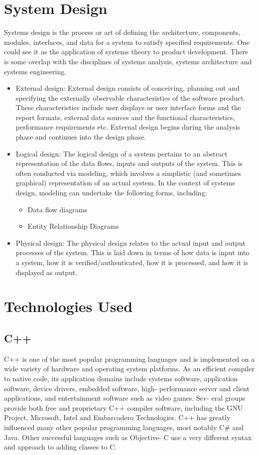 \section{System Design} Systems design is the process or art of defining 
the architecture, components, modules, interfaces, and data for a 
system to satisfy specified requirements. One could see it as the 
application of systems theory to product development. There is some 
overlap with the disciplines of systems analysis, systems architecture 
and systems engineering.
\begin{itemize}
\item  External design: External design consists of conceiving, 
planning out and specifying the externally observable characteristics 
of the software product. These characteristics include user displays 
or user interface forms and the report formats, external data sources 
and the functional characteristics, performance requirements etc. 
External design begins during the analysis phase
and continues into the design phase.
\item  Logical design: The logical design of a system pertains to an 
abstract representation of the data flows, inputs and outputs of the 
system. This is often conducted via modeling, which involves a 
simplistic (and sometimes graphical) representation of an actual 
system. In the context of systems design, modeling can undertake the 
following forms, including:
\begin{itemize}
\item Data flow diagrams
\item Entity Relationship Diagrams
\end{itemize}
\item  Physical design: The physical design relates to the actual 
input and output processes of the system. This is laid down in terms 
of how data is input into a system, how it is verified/authenticated, 
how it is processed, and how it is displayed as output.
\end{itemize}
\section{Technologies Used}
\subsection{C++}
\noindent C++ is one of the most popular programming languages and is implemented on a wide variety of
hardware and operating system platforms. As an efficient compiler to native code, its application
domains include systems software, application software, device drivers, embedded software, high-
performance server and client applications, and entertainment software such as video games. Sev-
eral groups provide both free and proprietary C++ compiler software, including the GNU Project,
Microsoft, Intel and Embarcadero Technologies. C++ has greatly influenced many other popular
programming languages, most notably C\# and Java. Other successful languages such as Objective-
C use a very different syntax and approach to adding classes to C.\\

